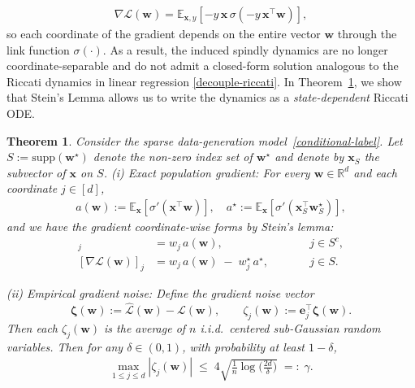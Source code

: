 \documentclass{article}
\theoremstyle{plain}
\newtheorem{theorem}{Theorem}[section]
\theoremstyle{definition}
\theoremstyle{remark}
\begin{document}
\begin{align}
\nabla \mathcal L(\mathbf w)
=
\mathbb E_{\mathbf x,y}\!\left[-y\,\mathbf x\,\sigma\!\left(-y\,\mathbf x^\top \mathbf w\right)\right],
\end{align}
so each coordinate of the gradient depends on the entire vector $\mathbf w$ through the link function $\sigma(\cdot)$. As a result, the induced spindly dynamics are no longer coordinate-separable and do not admit a closed-form solution analogous to the Riccati dynamics in linear regression \eqref{decouple-riccati}. In Theorem~\ref{pop-grad}, we show that Stein's Lemma allows us to write the dynamics as a \textit{state-dependent} Riccati ODE. 
\begin{theorem}
\label{pop-grad}
Consider the sparse data-generation model~\eqref{conditional-label}. Let $S:=\mathrm{supp}(\mathbf w^\star)$ denote the non-zero index set of $\mathbf{w}^{\star}$ and denote by $\mathbf x_S$ the subvector of $\mathbf x$ on $S$. 
(i) Exact population gradient:
For every $\mathbf w\in\mathbb R^d$ and each coordinate $j\in[d]$,
\begin{align}
    a(\mathbf w):=\mathbb E_{\mathbf x}\!\left[\sigma'(\mathbf x^\top \mathbf w)\right],
\quad
a^\star:=\mathbb E_{\mathbf x}\!\left[\sigma'(\mathbf x_S^\top \mathbf w_S^\star)\right],
\end{align}
and we have the gradient coordinate-wise forms by Stein's lemma:
\begin{align}
[\nabla \mathcal{L}(\mathbf w)]_{j} &= w_j\, a(\mathbf w), \qquad && j\in S^c,
\label{eq:pop_grad_inactive}
\\
[\nabla \mathcal{L}(\mathbf w)]_{j} &= w_j\, a(\mathbf w) \;-\; w_j^\star\, a^\star, \qquad && j\in S.
\label{eq:pop_grad_active}
\end{align}

 (ii) Empirical gradient noise:
Define the gradient noise vector
\[
\boldsymbol\zeta(\mathbf w):=\widehat {\mathcal{L}}(\mathbf w)-\mathcal{L}(\mathbf w),
\qquad
\zeta_j(\mathbf w):=\mathbf e_j^\top \boldsymbol\zeta(\mathbf w).
\]
 Then each $\zeta_j(\mathbf w)$ is the average of $n$ i.i.d.\ centered sub-Gaussian random variables. Then for any $\delta\in(0,1)$, with probability at least $1-\delta$,
\begin{align}
\max_{1\le j\le d} |\zeta_j(\mathbf w)|
\;\le\;
4\sqrt{\frac{1}{n}\log\!\Big(\frac{2d}{\delta}\Big)}
\;=:\;\gamma.
\label{eq:uniform_coord_noise}
\end{align}
\end{theorem}
\end{document}
